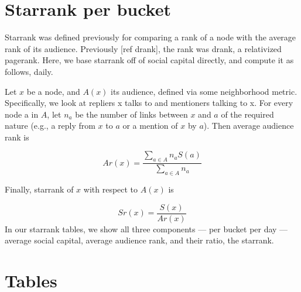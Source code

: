 \documentclass[10pt,oneside]{memoir}
\def\mybibliostyle{plain}
\def\bibliocommand{}
\begin{document}
\section{Starrank per bucket}
\label{starrankperbucket}

Starrank was defined previously for comparing a rank of a node with the average rank of its audience.  Previously [ref drank], the rank was drank, a relativized pagerank.  Here, we base starrank off of social capital directly, and compute it as follows, daily.



Let $x$ be a node, and $A(x)$ its audience, defined via some neighborhood metric.  Specifically, we look at repliers x talks to and mentioners talking to x.  For every node a in $A$, let $n_a$ be the number of links between $x$ and $a$ of the required nature (e.g., a reply from $x$ to $a$ or a mention of $x$ by $a$).  Then average audience rank is

\[ Ar(x) = \frac{\sum_{a \in A} n_a S(a)}{\sum_{a \in A} n_a} \]

Finally, starrank of $x$ with respect to $A(x)$ is

\[ Sr(x) = \frac{S(x)}{Ar(x)} \]
In our starrank tables, we show all three components --- per bucket per day --- average social capital, average audience rank, and their ratio, the starrank.


\pagebreak \section{Tables}
\label{tables}


\appendixpage
\pagestyle{empty}


%
%

\backmatter


\bibliocommand

\printglossary


\printindex
\end{document}
